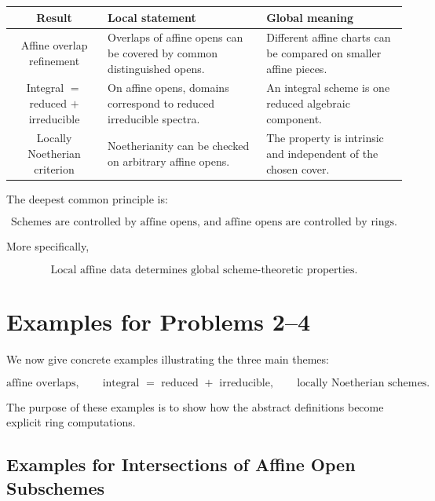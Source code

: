 \documentclass[12pt,a4paper]{article}
\theoremstyle{notespace}
\begin{document}
\begin{center}
	\renewcommand{\arraystretch}{1.15}
	\setlength{\tabcolsep}{6pt}
	
	\begin{tabular}{c|>{\raggedright\arraybackslash}p{5cm}|>{\raggedright\arraybackslash}p{5cm}}
		\toprule
		\textbf{Result} & \textbf{Local statement} & \textbf{Global meaning} \\
		\midrule
		Affine overlap refinement
		&
		Overlaps of affine opens can be covered by common distinguished opens.
		&
		Different affine charts can be compared on smaller affine pieces.
		\\
		\midrule
		Integral \(=\) reduced \(+\) irreducible
		&
		On affine opens, domains correspond to reduced irreducible spectra.
		&
		An integral scheme is one reduced algebraic component.
		\\
		\midrule
		Locally Noetherian criterion
		&
		Noetherianity can be checked on arbitrary affine opens.
		&
		The property is intrinsic and independent of the chosen cover.
		\\
		\bottomrule
	\end{tabular}
\end{center}

The deepest common principle is:

\[
\boxed{
	\text{Schemes are controlled by affine opens, and affine opens are controlled by rings.}
}
\]

More specifically,

\[
\boxed{
	\text{Local affine data determines global scheme-theoretic properties.}
}
\]


\section{Examples for Problems 2--4}

We now give concrete examples illustrating the three main themes:

\[
\text{affine overlaps},
\qquad
\text{integral }=\text{ reduced }+\text{ irreducible},
\qquad
\text{locally Noetherian schemes}.
\]

The purpose of these examples is to show how the abstract definitions become explicit ring computations.

\subsection{Examples for Intersections of Affine Open Subschemes}
\end{document}
